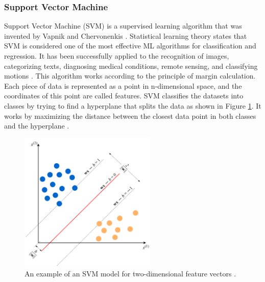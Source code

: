 \documentclass[12pt]{diazessay}
\begin{document}
    \subsubsection{Support Vector Machine} 
    \hspace{0.7cm} Support Vector Machine (SVM) is a supervised learning algorithm that was invented by Vapnik and Chervonenkis \cite{Ghosh2019-wm}. Statistical learning theory states that SVM is considered one of the most effective ML algorithms for classification and regression. It has been successfully applied to the recognition of images, categorizing texts, diagnosing medical conditions, remote sensing, and classifying motions \cite{Yuan2010-kh}. This algorithm works according to the principle of margin calculation. Each piece of data is represented as a point in n-dimensional space, and the coordinates of this point are called features. SVM classifies the datasets into classes by trying to find a hyperplane that splits the data as shown in Figure \ref{fig:SVM model}. It works by maximizing the distance between the closest data point in both classes and the hyperplane \cite{Alzubi2018-qf}.
    \begin{figure}[htp]
        \centering
        \includegraphics[width=6.5cm]{Figures/SVM example.png}
        \caption[An example of an SVM model for two-dimensional feature vectors]{An example of an SVM model for two-dimensional feature vectors \cite{Burkov2019-rd}.}
        \label{fig:SVM model}
    \end{figure}
        
\end{document}
